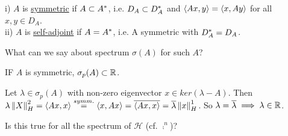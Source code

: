 \documentclass{article}
\begin{document}
\begin{definition}\nl
	i)  $A$ is {\underline{symmetric}} if $A\subset {A}^*$, i.e. $D_A\subset D_{A}^*$ and $\left<{Ax},{y}\right>=\left<{x},{Ay}\right>$ for all $x,y\in D_A$.\\
	ii) $A$ is {\underline{self-adjoint}} if $A={A}^*$, i.e. A symmetric with $D_{A}^*=D_A$.
\end{definition}

What can we say about spectrum $\sigma(A)$ for such $A$?

\begin{lemma}
	IF $A$ is symmetric, $\sigma_p(A)\subset\mathbb{R}$.
	\begin{pf}{}{}
		Let $\lambda\in\sigma_p(A)$ with non-zero eigenvector $x\in ker(\lambda-A)$. Then $\lambda\left\|{X}\right\|_H^2=\left<{Ax},{x}\right>\stackrel{symm.}{=}\left<{x},{Ax}\right>=\overline{\left<{Ax},{x}\right>}=\overline{\lambda}\left\|{x}\right\|_H^1$. So $\lambda=\overline{\lambda}\implies \lambda\in\mathbb{R}$.
	\end{pf}
\end{lemma}
Is this true for all the spectrum of $\mathcal{H}$ (cf. $\comp^n$)?
\end{document}
